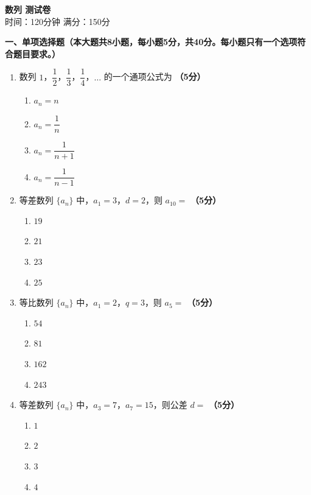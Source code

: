 \documentclass[12pt, a4paper]{ctexart}
\newcommand{\score}[1]{\hfill\textbf{（#1分）}}
\begin{document}
\begin{center}
{\Large\bfseries 数列 测试卷}\\[0.5em]
{\normalsize 时间：120分钟 \quad 满分：150分}
\end{center}

\vspace{1em}

\noindent\textbf{一、单项选择题（本大题共8小题，每小题5分，共40分。每小题只有一个选项符合题目要求。）}

\vspace{0.5em}

\begin{enumerate}
\item 数列 $1$，$\dfrac{1}{2}$，$\dfrac{1}{3}$，$\dfrac{1}{4}$，$\ldots$ 的一个通项公式为 \score{5}
\begin{enumerate}[label=\Alph*.]
\item $a_n=n$
\item $a_n=\dfrac{1}{n}$
\item $a_n=\dfrac{1}{n+1}$
\item $a_n=\dfrac{1}{n-1}$
\end{enumerate}

\item 等差数列 $\{a_n\}$ 中，$a_1=3$，$d=2$，则 $a_{10}=$ \score{5}
\begin{enumerate}[label=\Alph*.]
\item $19$
\item $21$
\item $23$
\item $25$
\end{enumerate}

\item 等比数列 $\{a_n\}$ 中，$a_1=2$，$q=3$，则 $a_5=$ \score{5}
\begin{enumerate}[label=\Alph*.]
\item $54$
\item $81$
\item $162$
\item $243$
\end{enumerate}

\item 等差数列 $\{a_n\}$ 中，$a_3=7$，$a_7=15$，则公差 $d=$ \score{5}
\begin{enumerate}[label=\Alph*.]
\item $1$
\item $2$
\item $3$
\item $4$
\end{enumerate}


\end{enumerate}
\end{document}
